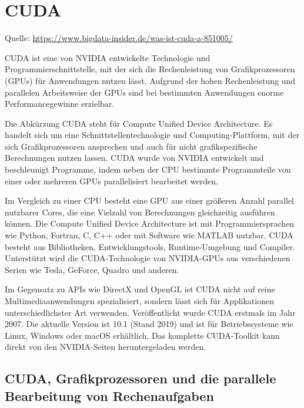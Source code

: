 %
%


\chapter{CUDA}


{\tiny Quelle: \url{https://www.bigdata-insider.de/was-ist-cuda-a-851005/}}

\bigskip

CUDA ist eine von NVIDIA entwickelte Technologie und Programmierschnittstelle, mit der sich die Rechenleistung von Grafikprozessoren (GPUs) für Anwendungen nutzen lässt. Aufgrund der hohen Rechenleistung und parallelen Arbeitsweise der GPUs sind bei bestimmten Anwendungen enorme Performancegewinne erzielbar.

Die Abkürzung CUDA steht für Compute Unified Device Architecture. Es handelt sich um eine Schnittstellentechnologie und Computing-Plattform, mit der sich Grafikprozessoren ansprechen und auch für nicht grafikspezifische Berechnungen nutzen lassen. CUDA wurde von NVIDIA entwickelt und beschleunigt Programme, indem neben der CPU bestimmte Programmteile von einer oder mehreren GPUs parallelisiert bearbeitet werden. 

Im Vergleich zu einer CPU besteht eine GPU aus einer größeren Anzahl parallel nutzbarer Cores, die eine Vielzahl von Berechnungen gleichzeitig ausführen können. Die Compute Unified Device Architecture ist mit Programmiersprachen wie Python, Fortran, C, C++ oder mit Software wie MATLAB nutzbar. CUDA besteht aus Bibliotheken, Entwicklungstools, Runtime-Umgebung und Compiler. Unterstützt wird die CUDA-Technologie von NVIDIA-GPUs aus verschiedenen Serien wie Tesla, GeForce, Quadro und anderen.

Im Gegensatz zu APIs wie DirectX und OpenGL ist CUDA nicht auf reine Multimediaanwendungen spezialisiert, sondern lässt sich für Applikationen unterschiedlichster Art verwenden. Veröffentlicht wurde CUDA erstmals im Jahr 2007. Die aktuelle Version ist 10.1 (Stand 2019) und ist für Betriebssysteme wie Linux, Windows oder macOS erhältlich. Das komplette CUDA-Toolkit kann direkt von den NVIDIA-Seiten heruntergeladen werden.


\section{CUDA, Grafikprozessoren und die parallele Bearbeitung von Rechenaufgaben}


